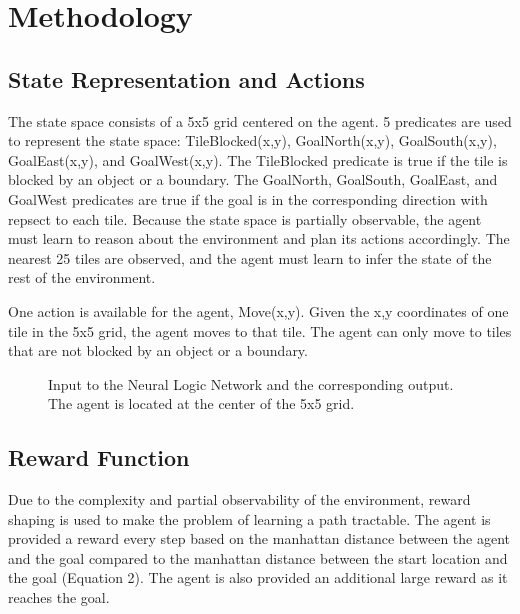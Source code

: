 \documentclass{article}
\begin{document}
\section{Methodology}

\subsection{State Representation and Actions}

The state space consists of a 5x5 grid centered on the agent. 5 predicates are used to represent the state space: TileBlocked(x,y), GoalNorth(x,y), GoalSouth(x,y), GoalEast(x,y), and GoalWest(x,y). The TileBlocked predicate is true if the tile is blocked by an object or a boundary. The GoalNorth, GoalSouth, GoalEast, and GoalWest predicates are true if the goal is in the corresponding direction with repsect to each tile. Because the state space is partially observable, the agent must learn to reason about the environment and plan its actions accordingly. The nearest 25 tiles are observed, and the agent must learn to infer the state of the rest of the environment.

One action is available for the agent, Move(x,y). Given the x,y coordinates of one tile in the 5x5 grid, the agent moves to that tile. The agent can only move to tiles that are not blocked by an object or a boundary. 

\begin{figure}[h]
  
  \centering
  
  \caption{Input to the Neural Logic Network and the corresponding output. The agent is located at the center of the 5x5 grid. }
\end{figure}

\subsection{Reward Function}

Due to the complexity and partial observability of the environment, reward shaping is used to make the problem of learning a path tractable. The agent is provided a reward every step based on the manhattan distance between the agent and the goal compared to the manhattan distance between the start location and the goal (Equation 2). The agent is also provided an additional large reward as it reaches the goal.
\end{document}
